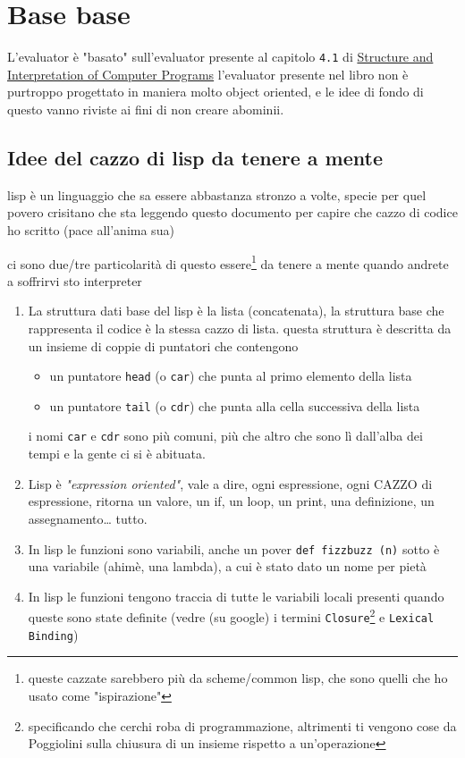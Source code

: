 \documentclass[11pt]{article}
\author{Biggie Dickus}
\date{\today}
\title{}
\begin{document}
\tableofcontents

\section{Base base}
\label{sec:orge75e878}
L'evaluator è "basato" sull'evaluator presente al capitolo \texttt{4.1} di \href{https://web.mit.edu/6.001/6.037/sicp.pdf}{Structure and Interpretation of Computer Programs}
l'evaluator presente nel libro non è purtroppo progettato in maniera molto object oriented, e le idee di fondo di questo vanno riviste ai fini di non creare abominii.

\subsection{Idee del cazzo di lisp da tenere a mente}
\label{sec:orgd5da389}
lisp è un linguaggio che sa essere abbastanza stronzo a volte, specie per quel povero crisitano che sta leggendo questo documento per capire che cazzo di codice ho scritto (pace all'anima sua)

ci sono due/tre particolarità di questo essere\footnote{queste cazzate sarebbero più da scheme/common lisp, che sono quelli che ho usato come "ispirazione"} da tenere a mente quando andrete a soffrirvi sto interpreter
\begin{enumerate}
\item La struttura dati base del lisp è la lista (concatenata), la struttura base che rappresenta il codice è la stessa cazzo di lista.
questa struttura è descritta da un insieme di coppie di puntatori che contengono
\begin{itemize}
\item un puntatore \texttt{head} (o \texttt{car}) che punta al primo elemento della lista
\item un puntatore \texttt{tail} (o \texttt{cdr}) che punta alla cella successiva della lista
\end{itemize}
i nomi \texttt{car} e \texttt{cdr} sono più comuni, più che altro che sono lì dall'alba dei tempi e la gente ci si è abituata.
\item Lisp è \emph{"expression oriented"}, vale a dire, ogni espressione, ogni CAZZO di espressione, ritorna un valore, un if, un loop, un print, una definizione, un assegnamento\ldots{} tutto.
\item In lisp le funzioni sono variabili, anche un pover \texttt{def fizzbuzz (n)} sotto è una variabile (ahimè, una lambda), a cui è stato dato un nome per pietà
\item In lisp le funzioni tengono traccia di tutte le variabili locali presenti quando queste sono state definite (vedre (su google) i termini \texttt{Closure}\footnote{specificando che cerchi roba di programmazione, altrimenti ti vengono cose da Poggiolini sulla chiusura di un insieme rispetto a un'operazione} e \texttt{Lexical Binding})
\end{enumerate}
\end{document}

